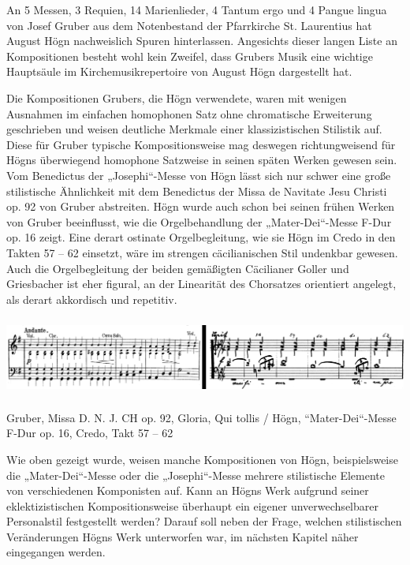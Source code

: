 \begin{figure}
\img{}
\caption{}
\end{figure}

An 5 Messen, 3 Requien, 14 Marienlieder, 4 Tantum ergo und 4 Pangue
lingua von Josef Gruber aus dem Notenbestand der Pfarrkirche St.
Laurentius hat August Högn nachweislich Spuren hinterlassen. Angesichts
dieser langen Liste an Kompositionen besteht wohl kein Zweifel, dass
Grubers Musik eine wichtige Hauptsäule im Kirchemusikrepertoire von
August Högn dargestellt hat.

Die Kompositionen Grubers, die Högn verwendete, waren mit wenigen
Ausnahmen im einfachen homophonen Satz ohne chromatische Erweiterung
geschrieben und weisen deutliche Merkmale einer klassizistischen
Stilistik auf. Diese für Gruber typische Kompositionsweise mag deswegen
richtungweisend für Högns überwiegend homophone Satzweise in seinen
späten Werken gewesen sein. Vom Benedictus der „Josephi“-Messe von Högn
lässt sich nur schwer eine große stilistische Ähnlichkeit mit dem
Benedictus der Missa de Navitate Jesu Christi op. 92 von Gruber
abstreiten. Högn wurde auch schon bei seinen frühen Werken von Gruber
beeinflusst, wie die Orgelbehandlung der „Mater-Dei“-Messe F-Dur op. 16
zeigt. Eine derart ostinate Orgelbegleitung, wie sie Högn im Credo in
den Takten 57 – 62 einsetzt, wäre im strengen cäcilianischen Stil
undenkbar gewesen. Auch die Orgelbegleitung der beiden gemäßigten
Cäcilianer Goller und Griesbacher ist eher figural, an der Linearität
des Chorsatzes orientiert angelegt, als derart akkordisch und
repetitiv.


\includegraphics[width=15.977cm,height=2.589cm]{pictures/zulassungsarbeit-img094.png}

\begin{figure}
\img{}
\caption{}
\end{figure}

Gruber, Missa D. N. J. CH op. 92,
Gloria, Qui tollis / Högn, “Mater-Dei“-Messe F-Dur op. 16, Credo, Takt
57 – 62

Wie oben gezeigt wurde, weisen manche Kompositionen von Högn,
beispielsweise die „Mater-Dei“-Messe oder die „Josephi“-Messe mehrere
stilistische Elemente von verschiedenen Komponisten auf. Kann an Högns
Werk aufgrund seiner eklektizistischen Kompositionsweise überhaupt ein
eigener unverwechselbarer Personalstil festgestellt werden? Darauf soll
neben der Frage, welchen stilistischen Veränderungen Högns Werk
unterworfen war, im nächsten Kapitel näher eingegangen werden.
